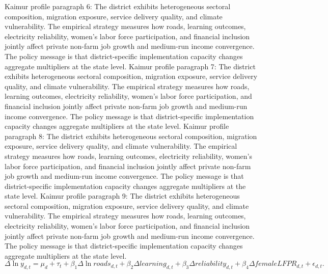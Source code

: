 \documentclass[preprint,12pt]{elsarticle}
\begin{document}
Kaimur profile paragraph 6: The district exhibits heterogeneous sectoral composition, migration exposure, service delivery quality, and climate vulnerability. The empirical strategy measures how roads, learning outcomes, electricity reliability, women's labor force participation, and financial inclusion jointly affect private non-farm job growth and medium-run income convergence. The policy message is that district-specific implementation capacity changes aggregate multipliers at the state level.
Kaimur profile paragraph 7: The district exhibits heterogeneous sectoral composition, migration exposure, service delivery quality, and climate vulnerability. The empirical strategy measures how roads, learning outcomes, electricity reliability, women's labor force participation, and financial inclusion jointly affect private non-farm job growth and medium-run income convergence. The policy message is that district-specific implementation capacity changes aggregate multipliers at the state level.
Kaimur profile paragraph 8: The district exhibits heterogeneous sectoral composition, migration exposure, service delivery quality, and climate vulnerability. The empirical strategy measures how roads, learning outcomes, electricity reliability, women's labor force participation, and financial inclusion jointly affect private non-farm job growth and medium-run income convergence. The policy message is that district-specific implementation capacity changes aggregate multipliers at the state level.
Kaimur profile paragraph 9: The district exhibits heterogeneous sectoral composition, migration exposure, service delivery quality, and climate vulnerability. The empirical strategy measures how roads, learning outcomes, electricity reliability, women's labor force participation, and financial inclusion jointly affect private non-farm job growth and medium-run income convergence. The policy message is that district-specific implementation capacity changes aggregate multipliers at the state level.
\begin{equation}\Delta \ln y_{d,t}=\mu_d+\tau_t+\beta_1\Delta\ln roads_{d,t}+\beta_2\Delta learning_{d,t}+\beta_3\Delta reliability_{d,t}+\beta_4\Delta femaleLFPR_{d,t}+\epsilon_{d,t}.\end{equation}
\end{document}
